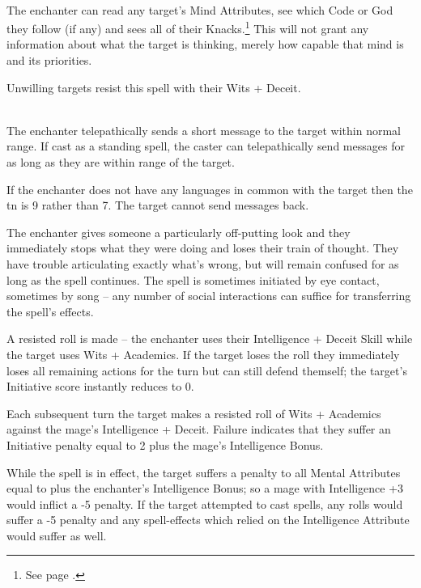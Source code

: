 \begin{multicols}{2}
\\
The enchanter can read any target's Mind Attributes, see which Code or God they follow (if any) and sees all of their Knacks.\footnote{See page \pageref{gods_codes}.}
This will not grant any information about what the target is thinking, merely how capable that mind is and its priorities.

Unwilling targets resist this spell with their Wits + Deceit.

\\
The enchanter telepathically sends a short message to the target within normal range. If cast as a standing spell, the caster can telepathically send messages for as long as they are within range of the target.

If the enchanter does not have any languages in common with the target then the \gls{tn} is 9 rather than 7. The target cannot send messages back.

\spelllevel


The enchanter gives someone a particularly off-putting look and they immediately stops what they were doing and loses their train of thought.
They have trouble articulating exactly what's wrong, but will remain confused for as long as the spell continues.
The spell is sometimes initiated by eye contact, sometimes by song -- any number of social interactions can suffice for transferring the spell's effects.

A resisted roll is made -- the enchanter uses their Intelligence + Deceit Skill while the target uses Wits + Academics.
If the target loses the roll they immediately loses all remaining actions for the turn but can still defend themself; the target's Initiative score instantly reduces to 0.

Each subsequent turn the target makes a resisted roll of Wits + Academics against the mage's Intelligence + Deceit. Failure indicates that they suffer an Initiative penalty equal to 2 plus the mage's Intelligence Bonus.

While the spell is in effect, the target suffers a penalty to all Mental Attributes equal to  plus the enchanter's Intelligence Bonus; so a mage with Intelligence +3 would inflict a -5 penalty. If the target attempted to cast spells, any rolls would suffer a -5 penalty and any spell-effects which relied on the Intelligence Attribute would suffer as well.


\end{multicols}
